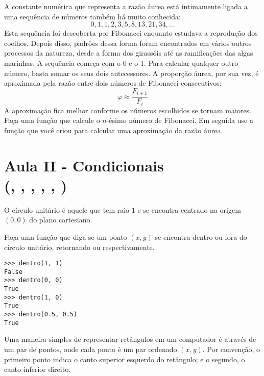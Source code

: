 \documentclass[12pt]{article}
\begin{document}
	A constante numérica que representa a razão áurea está intimamente ligada a uma sequência de números também há muito conhecida:
	$$0, 1, 1, 2, 3, 5, 8, 13, 21, 34, ...$$
	Esta sequência foi descoberta por Fibonacci enquanto estudava a reprodução dos coelhos. Depois disso, padrões dessa forma foram encontrados em vários outros processos da natureza, desde a forma dos girassóis até as ramificações das algas marinhas. A sequência começa com o 0 e o 1. Para calcular qualquer outro número, basta somar os seus dois antecessores. A proporção áurea, por sua vez, é aproximada pela razão entre dois números de Fibonacci consecutivos:
	$$\varphi \approx \frac{F_{i+1}}{F_{i}}$$
	A aproximação fica melhor conforme os números escolhidos se tornam maiores.\\
	
	\quest Faça uma função que calcule o $n$-ésimo número de Fibonacci. Em seguida use a função que você criou para calcular uma aproximação da razão áurea.
	
	
	
	\pagebreak
	
	\section{Aula II - Condicionais \\(, , , , , )}
	
	
	O círculo unitário é aquele que tem raio $1$ e se encontra centrado na origem $(0, 0)$ do plano cartesiano.
	
	
	
	\quest Faça uma função que diga se um ponto $(x, y)$ se encontra dentro ou fora do círculo unitário, retornando  ou  respectivamente.\\
	
	\example
	\begin{lstlisting}
>>> dentro(1, 1)
False
>>> dentro(0, 0)
True
>>> dentro(1, 0)
True
>>> dentro(0.5, 0.5)
True
	\end{lstlisting}
	
	\pagebreak
	
	
	Uma maneira simples de representar retângulos em um computador é através de um par de pontos, onde cada ponto é um par ordenado $(x, y)$. Por convenção, o primeiro ponto indica o canto superior esquerdo do retângulo; e o segundo, o canto inferior direito.\\
	
\end{document}
